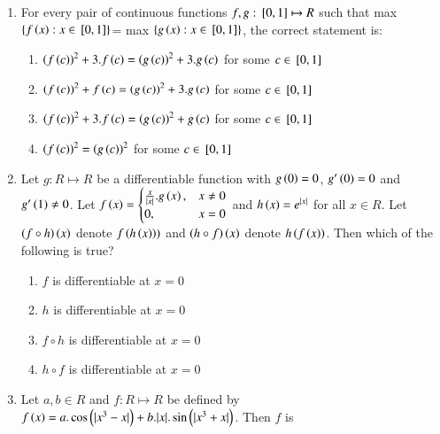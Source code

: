\documentclass[journal,12pt,twocolumn]{IEEEtran}
\theoremstyle{remark}
\begin{document}
\begin{enumerate}
    \item 
    For every pair of continuous functions $f, g: {}\left[0, 1\right]\mapsto R$ such that max $\left\{f\left(x\right): x\in {}\left[0, 1\right]\right\}$= max $\left\{g\left(x\right): x\in {}\left[0, 1\right]\right\}$, the correct statement is:
   
    \hfill 
    {}
    
    \begin{enumerate}[label=(\alph*)]
        
        \item ${\left(f\left(c\right)\right)}^2+3.f\left(c\right)={\left(g\left(c\right)\right)}^2+3.g\left(c\right)$ for some $c\in {}\left[0,1\right]$
        \item ${\left(f\left(c\right)\right)}^2+f\left(c\right)={\left(g\left(c\right)\right)}^2+3.g\left(c\right)$ for some $c\in {}\left[0,1\right]$
        \item ${\left(f\left(c\right)\right)}^2+3.f\left(c\right)={\left(g\left(c\right)\right)}^2+g\left(c\right)$ for some $c\in {}\left[0,1\right]$
        \item ${\left(f\left(c\right)\right)}^2={\left(g\left(c\right)\right)}^2$ for some $c\in {}\left[0,1\right]$ 
    \end{enumerate}


    \item 
    Let $g: R\mapsto R$ be a differentiable function with $g\left(0\right)=0$, $g'\left(0\right)=0$ and $g'\left(1\right)\neq 0$. Let $f\left(x\right)=
        \begin{cases}
            \frac{x}{|x|}.g\left(x\right), & x\neq 0 \\
            0, & x=0
        \end{cases}$ 
        and $h\left(x\right)=e^{|x|}$ for all $x\in R$. Let $\left(f\circ h\right)\left(x\right)$ denote $f\left(h\left(x\right)\right))$ and $\left(h\circ f\right)\left(x\right)$ denote $h\left(f\left(x\right)\right)$. Then which of the following is true?
        
    \hfill 
    {}
    
    \begin{enumerate}[label=(\alph*)]
        
        \item $f$ is differentiable at $x=0$ 
        \item $h$ is differentiable at $x=0$ 
        \item $f\circ h$ is differentiable at $x=0$ 
        \item $h\circ f$ is differentiable at $x=0$  
    \end{enumerate}


    \item 
    Let $a, b\in R$ and $f: R\mapsto R$ be defined by $f\left(x\right)=a.\cos \left(|x^3-x|\right) +b.|x|.\sin \left(|x^3+x|\right)$. Then $f$ is   
        

\end{enumerate}
\end{document}
